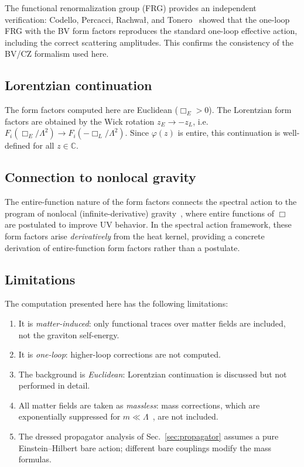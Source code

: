 \documentclass[aps,prd,twocolumn,superscriptaddress,nofootinbib,floatfix]{revtex4-2}
\theoremstyle{definition}
\theoremstyle{remark}
\begin{document}
The functional renormalization group (FRG) provides an independent
verification: Codello, Percacci, Rachwa{\l}, and
Tonero~\cite{Codello:2015oqa} showed that the one-loop FRG with the BV
form factors reproduces the standard one-loop effective action, including the
correct scattering amplitudes. This confirms the consistency of the BV/CZ
formalism used here.

\subsection{Lorentzian continuation}

The form factors computed here are Euclidean ($\Box_E > 0$). The Lorentzian
form factors are obtained by the Wick rotation $z_E \to -z_L$, i.e.\
$F_i(\Box_E/\Lambda^2) \to F_i(-\Box_L/\Lambda^2)$. Since $\varphi(z)$ is
entire, this continuation is well-defined for all $z \in \mathbb{C}$.

\subsection{Connection to nonlocal gravity}

The entire-function nature of the form factors connects the spectral action
to the program of nonlocal (infinite-derivative)
gravity~\cite{Modesto:2011kw,Tomboulis:1997gg,Biswas:2011ar}, where entire
functions of $\Box$ are postulated to improve UV behavior. In the spectral
action framework, these form factors arise \emph{derivatively} from the heat
kernel, providing a concrete derivation of entire-function form factors rather
than a postulate.

\subsection{Limitations}

The computation presented here has the following limitations:
\begin{enumerate}
\item It is \emph{matter-induced}: only functional traces over matter fields
  are included, not the graviton self-energy.
\item It is \emph{one-loop}: higher-loop corrections are not computed.
\item The background is \emph{Euclidean}: Lorentzian continuation is discussed
  but not performed in detail.
\item All matter fields are taken as \emph{massless}: mass corrections, which
  are exponentially suppressed for $m \ll \Lambda$~\cite{Gorbar:2002pw,Ribeiro:2018pyo},
  are not included.
\item The dressed propagator analysis of Sec.~\ref{sec:propagator} assumes a
  pure Einstein--Hilbert bare action; different bare couplings modify the
  mass formulas.
\end{enumerate}
\end{document}
